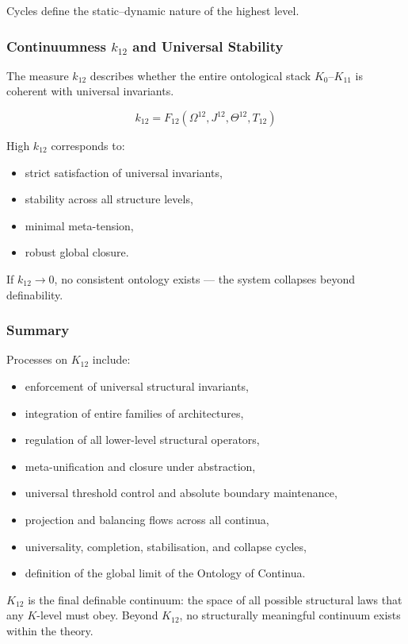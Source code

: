 Cycles define the static--dynamic nature of the highest level.

\subsubsection{Continuumness $k_{12}$ and Universal Stability}

The measure $k_{12}$ describes whether
the entire ontological stack $K_0$--$K_{11}$ 
is coherent with universal invariants.

\[
k_{12} = F_{12}(\Omega^{12}, J^{12}, \Theta^{12}, T_{12})
\]

High $k_{12}$ corresponds to:
\begin{itemize}
    \item strict satisfaction of universal invariants,
    \item stability across all structure levels,
    \item minimal meta-tension,
    \item robust global closure.
\end{itemize}

If $k_{12} \to 0$,  
no consistent ontology exists --- the system collapses beyond definability.

\subsubsection{Summary}

Processes on $K_{12}$ include:
\begin{itemize}
    \item enforcement of universal structural invariants,
    \item integration of entire families of architectures,
    \item regulation of all lower-level structural operators,
    \item meta-unification and closure under abstraction,
    \item universal threshold control and absolute boundary maintenance,
    \item projection and balancing flows across all continua,
    \item universality, completion, stabilisation, and collapse cycles,
    \item definition of the global limit of the Ontology of Continua.
\end{itemize}

$K_{12}$ is the final definable continuum:  
the space of all possible structural laws that any $K$-level must obey.  
Beyond $K_{12}$, no structurally meaningful continuum exists within the theory.

